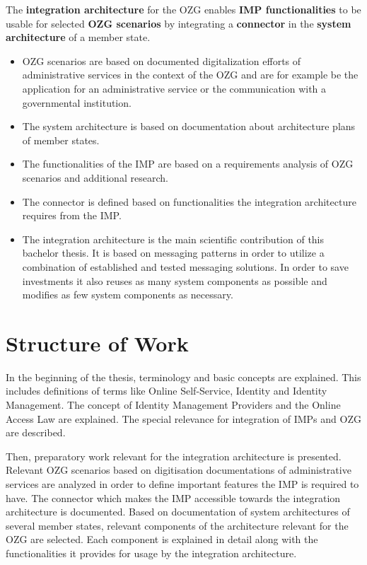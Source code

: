 \documentclass[
     12pt,         %
     a4paper,      %
     BCOR=10mm,version=first,     %
     DIV=14,version=first,        %
     ]{scrreprt}
\begin{document}
The \textbf{integration architecture} for the OZG enables \textbf{IMP functionalities} to be usable for selected \textbf{OZG scenarios} by integrating a \textbf{connector} in the \textbf{system architecture} of a member state.

\begin{itemize}
    \item OZG scenarios are based on documented digitalization efforts of administrative services in the context of the OZG and are for example be the application for an administrative service or the communication with a governmental institution.
    \item The system architecture is based on documentation about architecture plans of member states.
    \item The functionalities of the IMP are based on a requirements analysis of OZG scenarios and additional research.
    \item The connector is defined based on functionalities the integration architecture requires from the IMP.
    \item The integration architecture is the main scientific contribution of this bachelor thesis. It is based on messaging patterns in order to utilize a combination of established and tested messaging solutions. In order to save investments it also reuses as many system components as possible and modifies as few system components as necessary.
\end{itemize}

\chapter{Structure of Work}
In the beginning of the thesis, terminology and basic concepts are explained.
This includes definitions of terms like Online Self-Service, Identity and Identity Management. The concept of Identity Management Providers and the Online Access Law are explained. The special relevance for integration of IMPs and OZG are described.

Then, preparatory work relevant for the integration architecture is presented. Relevant OZG scenarios based on digitisation documentations of administrative services are analyzed in order to define important features the IMP is required to have. The connector which makes the IMP accessible towards the integration architecture is documented. Based on documentation of system architectures of several member states, relevant components of the architecture relevant for the OZG are selected. Each component is explained in detail along with the functionalities it provides for usage by the integration architecture.
\end{document}
